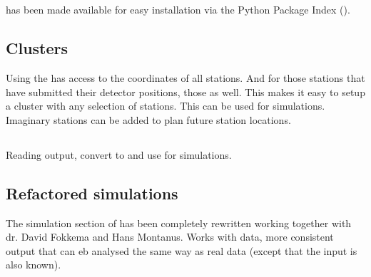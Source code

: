 \section{\sapphire}


\subsection{\pypi}

\sapphire has been made available for easy installation via the Python
Package Index (\pypi).


\subsection{Clusters}

Using the \api \sapphire has access to the \gps coordinates of all
stations. And for those stations that have submitted their detector
positions, those as well. This makes it easy to setup a cluster with any
selection of \hisparc stations. This can be used for simulations.
Imaginary stations can be added to plan future station locations.

\subsection{\corsika}

Reading \corsika output, convert to \hdf and use for simulations.


\subsection{Refactored simulations}

The simulation section of \sapphire has been completely rewritten
working together with dr. David Fokkema and Hans Montanus. Works with
\corsika data, more consistent output that can eb analysed the same way
as real \hisparc data (except that the input is also known).

